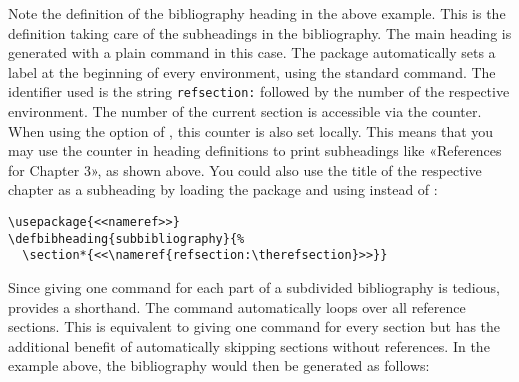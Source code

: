 %
Note the definition of the bibliography heading in the above example. This is the definition taking care of the subheadings in the bibliography. The main heading is generated with a plain  command in this case. The \biblatex package automatically sets a label at the beginning of every  environment, using the standard  command. The identifier used is the string \texttt{refsection:} followed by the number of the respective  environment. The number of the current section is accessible via the  counter. When using the  option of , this counter is also set locally. This means that you may use the counter in heading definitions to print subheadings like «References for Chapter 3», as shown above. You could also use the title of the respective chapter as a subheading by loading the  package and using  instead of :

\begin{lstlisting}[style=latex]
\usepackage{<<nameref>>}
\end{lstlisting}
%
Since giving one  command for each part of a subdivided bibliography is tedious, \biblatex provides a shorthand. The  command automatically loops over all reference sections. This is equivalent to giving one  command for every section but has the additional benefit of automatically skipping sections without references. In the example above, the bibliography would then be generated as follows:

